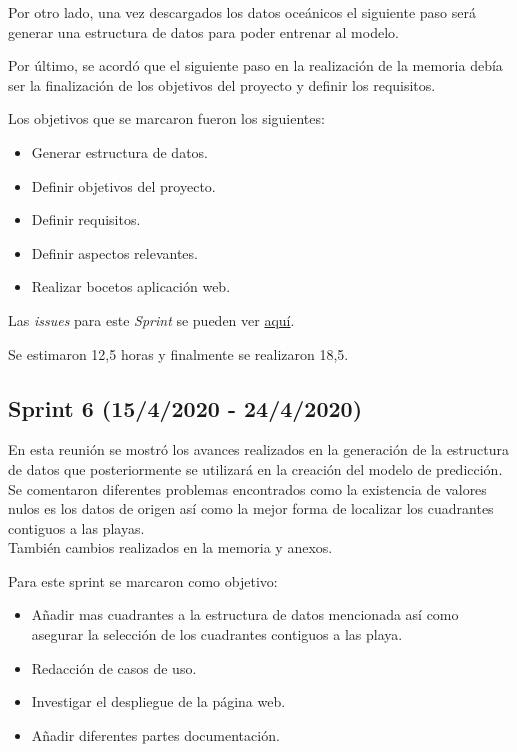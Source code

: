 Por otro lado, una vez descargados los datos oceánicos el siguiente paso será generar una estructura de datos para poder entrenar al modelo.

Por último, se acordó que el siguiente paso en la realización de la memoria debía ser la finalización de los objetivos del proyecto y definir los requisitos.

Los objetivos que se marcaron fueron los siguientes:
\begin{itemize}
	\item Generar estructura de datos.
	\item Definir objetivos del proyecto.
	\item Definir requisitos.
	\item Definir aspectos relevantes.
	\item Realizar bocetos aplicación web.
\end{itemize}

Las \emph{issues} para este \emph{Sprint} se pueden ver \href{https://github.com/psnti/TFG-Pablo-Santidrian-Tudanca/milestone/5}{aquí}.


Se estimaron 12,5 horas y finalmente se realizaron 18,5.

\subsection{Sprint 6 (15/4/2020 - 24/4/2020)}\label{Sprint-6}

En esta reunión se mostró los avances realizados en la generación de la estructura de datos que posteriormente se utilizará en la creación del modelo de predicción. Se comentaron diferentes problemas encontrados como la existencia de valores nulos es los datos de origen así como la mejor forma de localizar los cuadrantes contiguos a las playas.\\
También cambios realizados en la memoria y anexos.

Para este sprint se marcaron como objetivo:
\begin{itemize}
	\item Añadir mas cuadrantes a la estructura de datos mencionada así como asegurar la selección de los cuadrantes contiguos a las playa.
	\item Redacción de casos de uso.
	\item Investigar el despliegue de la página web.
	\item Añadir diferentes partes  documentación.
\end{itemize} 

